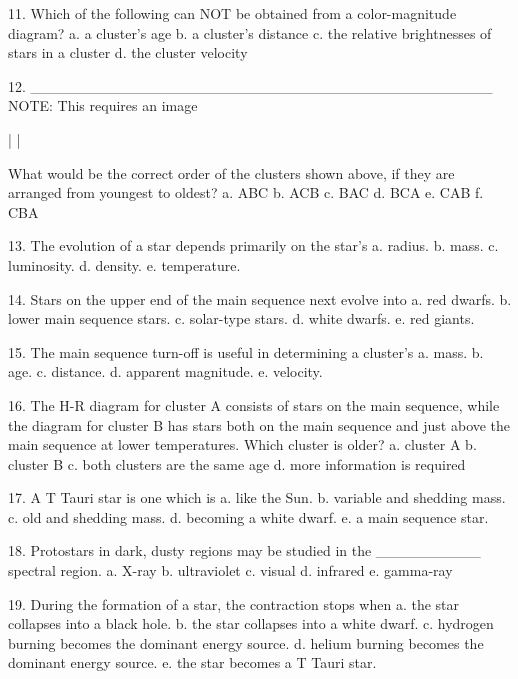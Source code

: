   11. Which of the following can NOT be obtained from a
      color-magnitude diagram?
      a.  a cluster's age
      b.  a cluster's distance
      c.  the relative brightnesses of stars in a cluster
      d.  the cluster velocity
      
  12. ____________________________________________
NOTE: This requires an image
    
      |                                              |
            
      What would be the correct order of the clusters shown above,
      if they are arranged from youngest to oldest?
      a.  ABC
      b.  ACB
      c.  BAC
      d.  BCA
      e.  CAB
      f.  CBA
      
  13. The evolution of a star depends primarily on the star's
      a.  radius.
      b.  mass.
      c.  luminosity.
      d.  density.
      e.  temperature.
 
 
  14. Stars on the upper end of the main sequence next evolve into
      a.  red dwarfs.
      b.  lower main sequence stars.
      c.  solar-type stars.
      d.  white dwarfs.
      e.  red giants.
      
  15. The main sequence turn-off is useful in determining a
      cluster's
      a.  mass.
      b.  age.
      c.  distance.
      d.  apparent magnitude.
      e.  velocity.
      
  16. The H-R diagram for cluster A consists of stars on the main
      sequence, while the diagram for cluster B has stars both on
      the main sequence and just above the main sequence at lower
      temperatures. Which cluster is older?
      a.  cluster A
      b.  cluster B
      c.  both clusters are the same age
      d.  more information is required
      
  17. A T Tauri star is one which is
      a.  like the Sun.
      b.  variable and shedding mass.
      c.  old and shedding mass.
      d.  becoming a white dwarf.
      e.  a main sequence star.
      
  18. Protostars in dark, dusty regions may be studied in the
      __________ spectral region.
      a.  X-ray
      b.  ultraviolet
      c.  visual
      d.  infrared
      e.  gamma-ray
      
  19. During the formation of a star, the contraction stops when
      a.  the star collapses into a black hole.
      b.  the star collapses into a white dwarf.
      c.  hydrogen burning becomes the dominant energy source.
      d.  helium burning becomes the dominant energy source.
      e.  the star becomes a T Tauri star.
      
